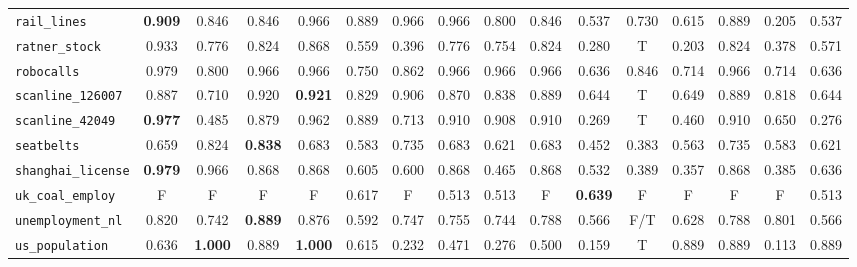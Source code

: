 \begin{table*}[h!]
\begin{adjustbox}{width=\textwidth}
\begin{tabular}{l|c|cccccccccccccc}
    \verb+rail_lines+ & \cellcolor{SeaGreen!06}\textbf{0.909} & 0.846 & 0.846 & 0.966 & 0.889 & 0.966 & {0.966} & 0.800 & 0.846 & 0.537 & 0.730 & 0.615 & 0.889 & 0.205 & 0.537\\
    
    \verb+ratner_stock+ & \cellcolor{blue!07}0.933 & 0.776 & 0.824 & 0.868 & 0.559 & 0.396 & 0.776 & 0.754 & 0.824 & 0.280 & T & 0.203 & 0.824 & 0.378 & 0.571\\
    
    \verb+robocalls+ & \cellcolor{blue!01}0.979 & 0.800 & 0.966 & 0.966 & 0.750 & 0.862 & 0.966 & 0.966 & 0.966 & 0.636 & 0.846 & 0.714 & 0.966 & 0.714 & 0.636\\
    
    \verb+scanline_126007+ & \cellcolor{SeaGreen!04}0.887 & 0.710 & 0.920 & \textbf{0.921} & 0.829 & 0.906 & 0.870 & 0.838 & 0.889 & 0.644 & T & 0.649 & 0.889 & 0.818 & 0.644\\
    
    \verb+scanline_42049+ & \cellcolor{blue!01}\textbf{0.977} & 0.485 & 0.879 & 0.962 & 0.889 & 0.713 & 0.910 & 0.908 & 0.910 & 0.269 & T & 0.460 & 0.910 & 0.650 & 0.276\\
    
    \verb+seatbelts+ & \cellcolor{SeaGreen!20}0.659 & 0.824 & \textbf{0.838} & 0.683 & 0.583 & 0.735 & 0.683 & 0.621 & 0.683 & 0.452 & 0.383 & 0.563 & 0.735 & 0.583 & 0.621\\
    
    \verb+shanghai_license+ & \cellcolor{blue!01}\textbf{0.979} & 0.966 & 0.868 & 0.868 & 0.605 & 0.600 & 0.868 & 0.465 & 0.868 & 0.532 & 0.389 & 0.357 & 0.868 & 0.385 & 0.636\\
    
    \cellcolor{gray!100}\verb+uk_coal_employ+ & \cellcolor{gray!100}F & \cellcolor{gray!100}F & \cellcolor{gray!100}F & \cellcolor{gray!100}F & \cellcolor{gray!100}0.617 & \cellcolor{gray!100}F & \cellcolor{gray!100}0.513 & \cellcolor{gray!100}0.513 & \cellcolor{gray!100}F & \cellcolor{gray!100}\textbf{0.639} & \cellcolor{gray!100}F & \cellcolor{gray!100}F & \cellcolor{gray!100}F & \cellcolor{gray!100}F & \cellcolor{gray!100}0.513\\
    
    \verb+unemployment_nl+ & \cellcolor{SeaGreen!07}0.820 & 0.742 & \textbf{0.889} & 0.876 & 0.592 & 0.747 & 0.755 & 0.744 & 0.788 & 0.566 & F/T & 0.628 & 0.788 & 0.801 & 0.566\\
    
    \verb+us_population+ & \cellcolor{SeaGreen!40}0.636 & \textbf{1.000} & 0.889 & \textbf{1.000} & 0.615 & 0.232 & 0.471 & 0.276 & 0.500 & 0.159 & T & 0.889 & 0.889 & 0.113 & 0.889\\
    

\end{tabular}
\end{adjustbox}
\end{table*}
